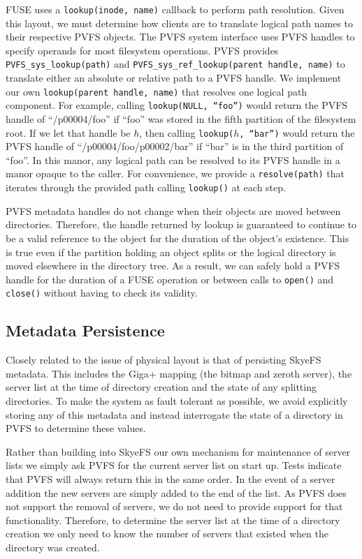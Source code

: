 \documentclass[twocolumn,letterpaper]{article}
\newcommand{\code}[1]{\texttt{#1}}
\begin{document}
FUSE uses a \code{lookup(inode, name)} callback to perform path resolution.  
Given this layout, we must determine how clients are to translate logical path
names to their respective PVFS objects.  The PVFS system interface uses PVFS
handles to specify operands for most filesystem operations.  PVFS provides
\code{PVFS\_\-sys\_\-lookup(path)} and
\code{PVFS\_\-sys\_\-ref\_\-lookup(parent handle, name)} to translate either
an absolute or relative path to a PVFS handle.  We implement our own
\code{lookup(parent handle, name)} that resolves one logical path component.
For example, calling \code{lookup(NULL, ``foo'')} would return the PVFS handle
of ``/p00004/foo'' if ``foo'' was stored in the fifth partition of the
filesystem root.  If we let that handle be $h$, then calling \code{lookup($h$,
``bar'')} would return the PVFS handle of ``/p00004/foo/p00002/bar'' if
``bar'' is in the third partition of ``foo''.  In this manor, any logical path
can be resolved to its PVFS handle in a manor opaque to the caller.  For
convenience, we provide a \code{resolve(path)} that iterates through the
provided path calling \code{lookup()} at each step.

PVFS metadata handles do not change when their objects are moved between
directories.  Therefore, the handle returned by lookup is guaranteed to continue
to be a valid reference to the object for the duration of the object's
existence.  This is true even if the partition holding an object splits or the
logical directory is moved elsewhere in the directory tree.  As a result, we can
safely hold a PVFS handle for the duration of a FUSE operation or between calls
to \code{open()} and \code{close()} without having to check its validity.


\subsection{Metadata Persistence}
Closely related to the issue of physical layout is that of persisting SkyeFS
metadata.  This includes the Giga+ mapping (the bitmap and zeroth server), the
server list at the time of directory creation and the state of any splitting
directories.  To make the system as fault tolerant as possible, we avoid
explicitly storing any of this metadata and instead interrogate the state of a
directory in PVFS to determine these values.

Rather than building into SkyeFS our own mechanism for maintenance of server
lists we simply ask PVFS for the current server list on start up.  Tests indicate
that PVFS will always return this in the same order.  In the event of a server
addition the new servers are simply added to the end of the list.  As PVFS does
not support the removal of servers, we do not need to provide support for that
functionality.  Therefore, to determine the server list at the time of a
directory creation we only need to know the number of servers that existed when
the directory was created.
\end{document}
